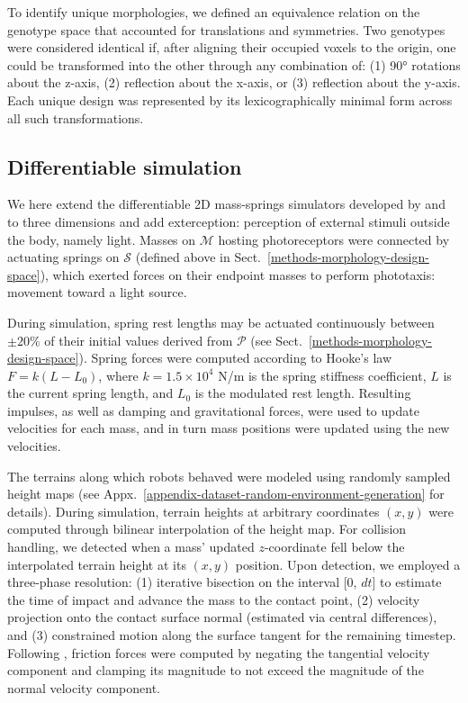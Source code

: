 To identify unique morphologies, we defined an equivalence relation on the genotype space that accounted for translations and symmetries. Two genotypes were considered identical if, after aligning their occupied voxels to the origin, one could be transformed into the other through any combination of: (1) 90° rotations about the z-axis, (2) reflection about the x-axis, or (3) reflection about the y-axis. Each unique design was represented by its lexicographically minimal form across all such transformations.

\subsection{Differentiable simulation}
\label{methods-simulator}

We here extend the differentiable 2D mass-springs simulators developed by \citet{hu2019difftaichi} and \cite{strgar2024evolution} to three dimensions and add exterception: perception of external stimuli outside the body, namely light.
Masses on $\mathcal{M}$ hosting photoreceptors were connected by actuating springs on $\mathcal{S}$ (defined above in Sect.~\ref{methods-morphology-design-space}), which exerted forces on their endpoint masses to perform phototaxis: movement toward a light source. 

During simulation, 
spring rest lengths may be actuated continuously between $\pm 20\%$ of their initial values derived from $\mathcal{P}$ (see Sect.~\ref{methods-morphology-design-space}). 
Spring forces were computed according to Hooke's law $F = k(L - L_0)$, where $k=1.5 \times 10^4$ N/m is the spring stiffness coefficient, $L$ is the current spring length, and $L_0$ is the modulated rest length. 
Resulting impulses, as well as damping and gravitational forces, were used to update velocities for each mass, and in turn mass positions were updated using the new velocities.

The terrains along which robots behaved were modeled using randomly sampled height maps (see Appx.~\ref{appendix-dataset-random-environment-generation} for details). 
During simulation, terrain heights at arbitrary coordinates $(x, y)$ were computed through bilinear interpolation of the height map. 
For collision handling, we detected when a mass' updated $z$-coordinate fell below the interpolated terrain height at its $(x, y)$ position. Upon detection, we employed a three-phase resolution: (1) iterative bisection on the interval [0, $dt$] to estimate the time of impact and advance the mass to the contact point, (2) velocity projection onto the contact surface normal (estimated via central differences), and (3) constrained motion along the surface tangent for the remaining timestep. Following \citet{strgar2024evolution}, friction forces were computed by negating the tangential velocity component and clamping its magnitude to not exceed the magnitude of the normal velocity component.

